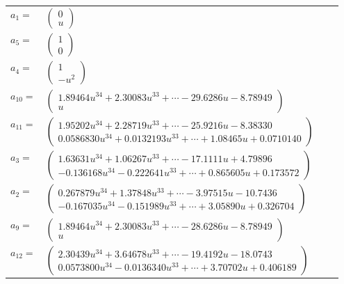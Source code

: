 \documentclass[1p]{elsarticle_modified}
\theoremstyle{definition}
\begin{document}
\begin{tabular}{m{7pt} m{180pt} m{7pt} m{180pt} }
\flushright $a_{1}=$&$\begin{pmatrix}0\\u\end{pmatrix}$ \\
\flushright $a_{5}=$&$\begin{pmatrix}1\\0\end{pmatrix}$ \\
\flushright $a_{4}=$&$\begin{pmatrix}1\\- u^2\end{pmatrix}$ \\
\flushright $a_{10}=$&$\begin{pmatrix}1.89464 u^{34}+2.30083 u^{33}+\cdots-29.6286 u-8.78949\\u\end{pmatrix}$ \\
\flushright $a_{11}=$&$\begin{pmatrix}1.95202 u^{34}+2.28719 u^{33}+\cdots-25.9216 u-8.38330\\0.0586830 u^{34}+0.0132193 u^{33}+\cdots+1.08465 u+0.0710140\end{pmatrix}$ \\
\flushright $a_{3}=$&$\begin{pmatrix}1.63631 u^{34}+1.06267 u^{33}+\cdots-17.1111 u+4.79896\\-0.136168 u^{34}-0.222641 u^{33}+\cdots+0.865605 u+0.173572\end{pmatrix}$ \\
\flushright $a_{2}=$&$\begin{pmatrix}0.267879 u^{34}+1.37848 u^{33}+\cdots-3.97515 u-10.7436\\-0.167035 u^{34}-0.151989 u^{33}+\cdots+3.05890 u+0.326704\end{pmatrix}$ \\
\flushright $a_{9}=$&$\begin{pmatrix}1.89464 u^{34}+2.30083 u^{33}+\cdots-28.6286 u-8.78949\\u\end{pmatrix}$ \\
\flushright $a_{12}=$&$\begin{pmatrix}2.30439 u^{34}+3.64678 u^{33}+\cdots-19.4192 u-18.0743\\0.0573800 u^{34}-0.0136340 u^{33}+\cdots+3.70702 u+0.406189\end{pmatrix}$ \\

\end{tabular}
\end{document}
